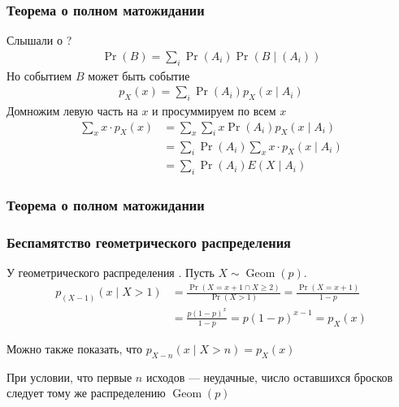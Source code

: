 \documentclass[hyperref=unicode,graphics=pdflatex,13pt,xcolor={usenames,dvipsnames}]{beamer}
\renewcommand\emph[1]{{\color{blue}{#1}}}
\DeclareMathOperator{\Geom}{Geom}
\begin{document}
\begin{frame}
  \frametitle{Теорема о полном матожидании}
  Слышали о \emph{полной вероятности}?
  \begin{align*}
    \Pr(B) = \sum_i \Pr(A_i) \Pr(B \mid (A_i)) 
  \end{align*}
  \pause
  Но событием $B$ может быть событие \emph{$X = x$}
  \begin{align*}
    p_X(x) = \sum_i \Pr(A_i) p_X(x \mid A_i) 
  \end{align*}
  \pause
  Домножим левую часть на $x$ и просуммируем по всем $x$
  \begin{align*}
    \sum_x x \cdot p_X(x) &= \sum_x \sum_i x \Pr(A_i) p_X(x \mid A_i) \\
                          &= \sum_i \Pr(A_i) \sum_x  x \cdot p_X(x \mid A_i) \\
                          &= \sum_i \Pr(A_i) E(X \mid A_i)
  \end{align*}
\end{frame}

\begin{frame}
  \frametitle{Теорема о полном матожидании}

  \begin{center}
  \end{center}
\end{frame}

\begin{frame}
  \frametitle{Беспамятство геометрического распределения}

  У геометрического распределения \emph{нет памяти}. Пусть $X \sim \Geom(p)$.
  \begin{align*}
    p_{(X - 1)}(x \mid X > 1) &= \frac{\Pr(X = x + 1 \cap X \ge 2)}{\Pr(X > 1)} = \frac{\Pr(X = x + 1)}{1 - p} \\
    &= \frac{p(1 - p)^x}{1 - p} = p(1 - p)^{x - 1} = p_X(x)
  \end{align*}

  \vspace{1cm}
  \pause
  Можно также показать, что $p_{X - n}(x \mid X > n) = p_X(x)$

  \vspace{1cm}
  \pause
  При условии, что первые $n$ исходов --- неудачные, число оставшихся бросков следует тому же распределению $\Geom(p)$
\end{frame}
\end{document}
